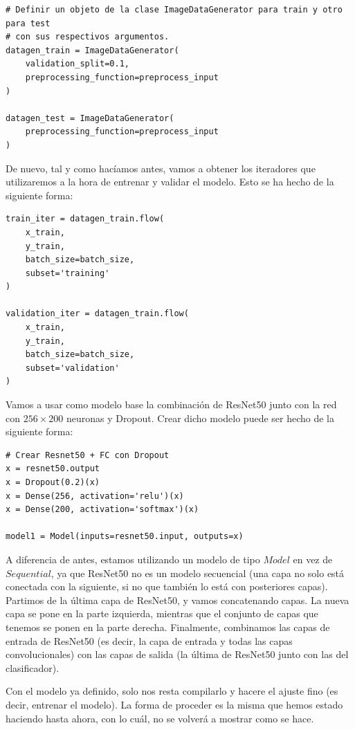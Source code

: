 \documentclass[11pt,a4paper]{article}
\begin{document}
\begin{lstlisting}
# Definir un objeto de la clase ImageDataGenerator para train y otro para test
# con sus respectivos argumentos.
datagen_train = ImageDataGenerator(
    validation_split=0.1,
    preprocessing_function=preprocess_input
)

datagen_test = ImageDataGenerator(
    preprocessing_function=preprocess_input
)
\end{lstlisting}

De nuevo, tal y como hacíamos antes, vamos a obtener los iteradores que utilizaremos a la hora de
entrenar y validar el modelo. Esto se ha hecho de la siguiente forma:

\begin{lstlisting}
train_iter = datagen_train.flow(
    x_train,
    y_train,
    batch_size=batch_size,
    subset='training'
)

validation_iter = datagen_train.flow(
    x_train,
    y_train,
    batch_size=batch_size,
    subset='validation'
)
\end{lstlisting}

Vamos a usar como modelo base la combinación de ResNet50 junto con la red con
$256 \times 200$ neuronas y Dropout. Crear dicho modelo puede ser hecho de la siguiente
forma:

\begin{lstlisting}
# Crear Resnet50 + FC con Dropout
x = resnet50.output
x = Dropout(0.2)(x)
x = Dense(256, activation='relu')(x)
x = Dense(200, activation='softmax')(x)

model1 = Model(inputs=resnet50.input, outputs=x)
\end{lstlisting}

A diferencia de antes, estamos utilizando un modelo de tipo $Model$ en vez de $Sequential$, ya
que ResNet50 no es un modelo secuencial (una capa no solo está conectada con la siguiente, si no
que también lo está con posteriores capas). Partimos de la última capa de ResNet50, y vamos
concatenando capas. La nueva capa se pone en la parte izquierda, mientras que el conjunto de capas que
tenemos se ponen en la parte derecha. Finalmente, combinamos las capas de entrada de ResNet50 (es
decir, la capa de entrada y todas las capas convolucionales) con las capas de salida (la última de
ResNet50 junto con las del clasificador).

Con el modelo ya definido, solo nos resta compilarlo y hacere el ajuste fino (es decir,
entrenar el modelo). La forma de proceder es la misma que hemos estado haciendo hasta ahora,
con lo cuál, no se volverá a mostrar como se hace.
\end{document}
